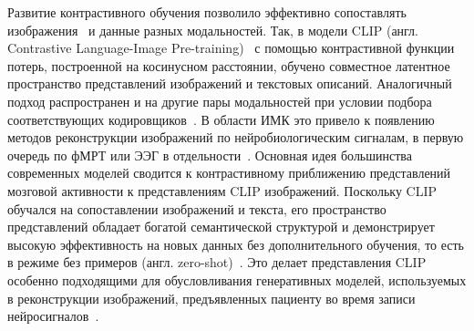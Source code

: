 Развитие контрастивного обучения позволило эффективно сопоставлять изображения~\cite{dorin2025pairwise} и данные разных модальностей. Так, в модели CLIP (англ. Contrastive Language-Image Pre-training)~\cite{radford2021learning} с помощью контрастивной функции потерь, построенной на косинусном расстоянии, обучено совместное латентное пространство представлений изображений и текстовых описаний. Аналогичный подход распространен и на другие пары модальностей при условии подбора соответствующих кодировщиков~\cite{hu2023audio, wang2023connecting}. В области ИМК это привело к появлению методов реконструкции изображений по нейробиологическим сигналам, в первую очередь по фМРТ или ЭЭГ в отдельности~\cite{huang2021fmri, li2024visual}. Основная идея большинства современных моделей сводится к контрастивному приближению представлений мозговой активности к представлениям CLIP изображений. Поскольку CLIP обучался на сопоставлении изображений и текста, его пространство представлений обладает богатой семантической структурой и демонстрирует высокую эффективность на новых данных без дополнительного обучения, то есть в режиме без примеров (англ. zero-shot)~\cite{radford2021learning}. Это делает представления CLIP особенно подходящими для обусловливания генеративных моделей, используемых в реконструкции изображений, предъявленных пациенту во время записи нейросигналов~\cite{li2024visual}.

